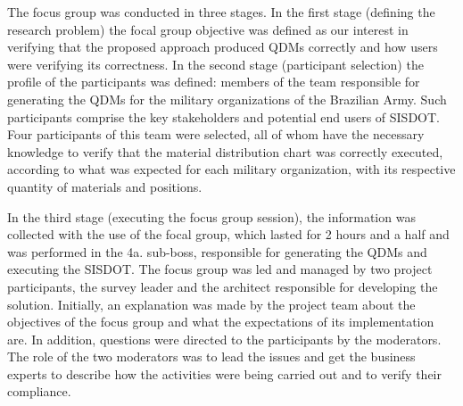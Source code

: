 \documentclass[twocolumn]{bmcart}%
\begin{document}
The focus group was conducted in three stages. In the first stage (defining the research problem) the focal group objective was defined as our interest in verifying that the proposed approach produced QDMs correctly and how users were verifying its correctness. In the second stage (participant selection) the profile of the participants was defined: members of the team responsible for generating the QDMs for the military organizations of the Brazilian Army. Such participants comprise the key stakeholders and potential end users of SISDOT. Four participants of this team were selected, all of whom have the necessary knowledge to verify that the material distribution chart was correctly executed, according to what was expected for each military organization, with its respective quantity of materials and positions.


In the third stage (executing the focus group session), the information was collected with the use of the focal group, which lasted for 2 hours and a half and was performed in the 4a. sub-boss, responsible for generating the QDMs and executing the SISDOT. The focus group was led and managed by two project participants, the survey leader and the architect responsible for developing the solution. Initially, an explanation was made by the project team about the objectives of the focus group and what the expectations of its implementation are. In addition, questions were directed to the participants by the moderators. The role of the two moderators was to lead the issues and get the business experts to describe how the activities were being carried out and to verify their compliance.
\end{document}
